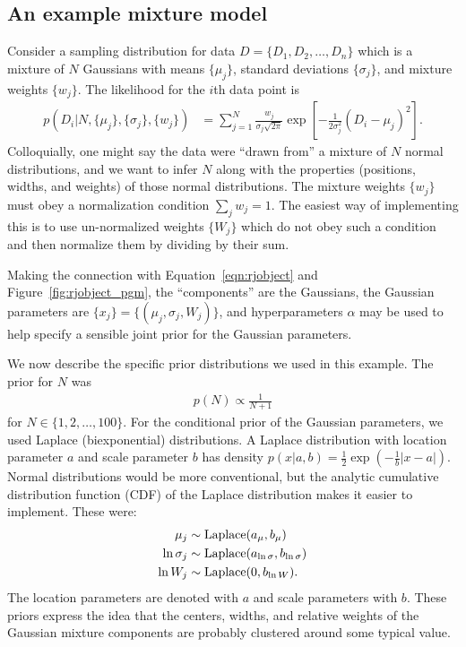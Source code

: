 \documentclass[article]{jss}
\begin{document}
\subsection{An example mixture model}
Consider a sampling distribution
for data $D=\{D_1, D_2, \ldots, D_n\}$ which is a mixture of $N$ Gaussians
with means $\{\mu_j\}$, standard deviations $\{\sigma_j\}$, and
mixture weights $\{w_j\}$. The likelihood for the $i$th data point is
\begin{align*}
p\left(D_i | N, \{\mu_j\}, \{\sigma_j\}, \{w_j\}\right) &=
\sum_{j=1}^N \frac{w_j}{\sigma_j\sqrt{2\pi}}
\exp\left[-\frac{1}{2\sigma_j^2}\left(D_i - \mu_j\right)^2\right].
\end{align*}
Colloquially, one might say the data were ``drawn from'' a mixture of
$N$ normal distributions, and we want to infer $N$ along with the
properties (positions, widths, and weights) of those normal distributions.
The mixture weights $\{w_j\}$ must obey a normalization condition
$\sum_j w_j = 1$. The easiest way of implementing this is to use
un-normalized weights $\{W_j\}$ which do not obey
such a condition and then normalize them by dividing by their sum.

Making the connection with Equation~\ref{eqn:rjobject} and
Figure~\ref{fig:rjobject_pgm}, the ``components'' are the Gaussians,
the Gaussian parameters are $\{x_j\} = \{(\mu_j, \sigma_j, W_j)\}$,
and hyperparameters $\alpha$ may be used to help specify
a sensible joint prior for the Gaussian parameters.

We now describe the specific prior distributions we used in this example.
The prior for $N$ was
\begin{align*}
p(N) \propto \frac{1}{N+1}
\end{align*}
for $N \in \{1, 2, \ldots, 100\}$.
For the conditional prior of the Gaussian parameters,
we used Laplace (biexponential)
distributions. A Laplace
distribution with location parameter $a$ and scale parameter
$b$ has density $p(x | a, b) = \frac{1}{2}\exp\left(-\frac{1}{b}|x - a|\right)$.
Normal distributions would be more conventional, but the analytic cumulative
distribution function (CDF) of the Laplace distribution makes it easier to
implement. These were:
\begin{align}
\mu_j &\sim \textnormal{Laplace}(a_\mu, b_\mu)\label{eqn:cond_prior1}\\
\ln\sigma_j &\sim \textnormal{Laplace}(a_{\ln\sigma}, b_{\ln\sigma})\label{eqn:cond_prior2}\\
\ln W_j &\sim \textnormal{Laplace}(0, b_{\ln W}).\label{eqn:cond_prior3}
\end{align}
The location parameters are denoted with $a$ and scale parameters with $b$.
These priors express the idea that the centers, widths, and relative weights
of the Gaussian mixture components are probably clustered around some typical
value.
\end{document}
